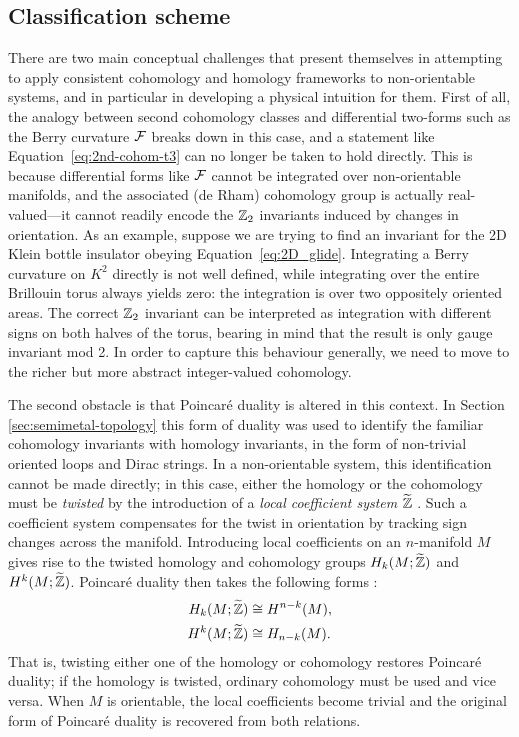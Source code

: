 \subsection{Classification scheme}

There are two main conceptual challenges that present themselves in attempting to apply consistent cohomology and homology frameworks to non-orientable systems, and in particular in developing a physical intuition for them. First of all, the analogy between second cohomology classes and differential two-forms such as the Berry curvature $\mathcal{F}$ breaks down in this case, and a statement like Equation~\eqref{eq:2nd-cohom-t3} can no longer be taken to hold directly. This is because differential forms like $\mathcal{F}$ cannot be integrated over non-orientable manifolds, and the associated (de Rham) cohomology group is actually real-valued---it cannot readily encode the $\mathbb{Z}_2$ invariants induced by changes in orientation. As an example, suppose we are trying to find an invariant for the 2D Klein bottle insulator obeying Equation~\eqref{eq:2D_glide}. Integrating a Berry curvature on $K^2$ directly is not well defined, while integrating over the entire Brillouin torus always yields zero: the integration is over two oppositely oriented areas. The correct $\mathbb{Z}_2$ invariant can be interpreted as integration with different signs on both halves of the torus, bearing in mind that the result is only gauge invariant mod 2. In order to capture this behaviour generally, we need to move to the richer but more abstract integer-valued cohomology.  %

The second obstacle is that Poincaré duality is altered in this context. In Section \ref{sec:semimetal-topology} this form of duality was used to identify the familiar cohomology invariants with homology invariants, in the form of non-trivial oriented loops and Dirac strings. In a non-orientable system, this identification cannot be made directly; in this case, either the homology or the cohomology must be \emph{twisted} by the introduction of a \emph{local coefficient system} $\widetilde{\mathbb{Z}}$ \cite{Whitehead_Homotopy,Hatcher_algebraic-topology}. Such a coefficient system compensates for the twist in orientation by tracking sign changes across the manifold. Introducing local coefficients on an $n$-manifold $M$ gives rise to the twisted homology and cohomology groups $H_k(M;\widetilde{\mathbb{Z}})$ and $H^k(M;\widetilde{\mathbb{Z}})$. Poincaré duality then takes the following forms \parencite[Thm. 3H.6]{Hatcher_algebraic-topology}:
\begin{align*}
	H_k(M;\widetilde{\mathbb{Z}}) &\cong H^{n-k}(M), \\
	H^k(M;\widetilde{\mathbb{Z}}) &\cong H_{n-k}(M).
\end{align*}
That is, twisting either one of the homology or cohomology restores Poincaré duality; if the homology is twisted, ordinary cohomology must be used and vice versa. When $M$ is orientable, the local coefficients become trivial and the original form of Poincaré duality is recovered from both relations.

